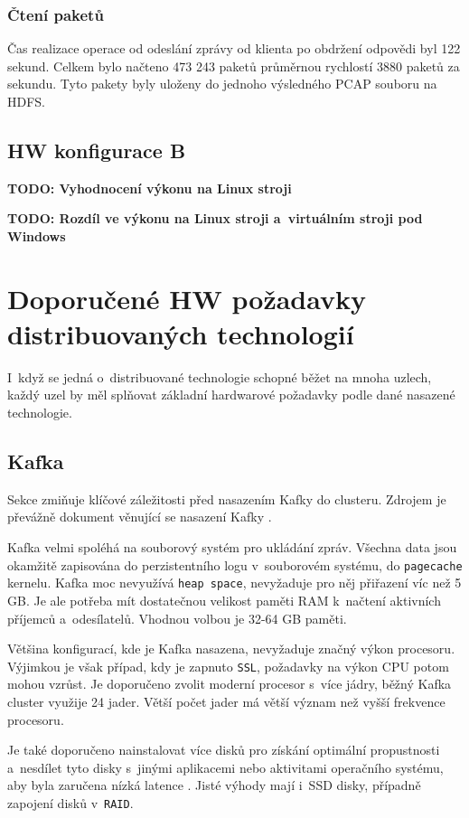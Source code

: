 \subsubsection{Čtení paketů}
Čas realizace operace od odeslání zprávy od klienta po obdržení odpovědi byl 122 sekund. Celkem bylo načteno 473 243 paketů průměrnou rychlostí 3880 paketů za sekundu. Tyto pakety byly uloženy do jednoho výsledného PCAP souboru na HDFS.

\subsection{HW konfigurace B}

\noindent \textbf{TODO: Vyhodnocení výkonu na Linux stroji}

\noindent \textbf{TODO: Rozdíl ve výkonu na Linux stroji a~virtuálním stroji pod Windows}

\section{Doporučené HW požadavky distribuovaných technologií}
I~když se jedná o~distribuované technologie schopné běžet na mnoha uzlech, každý uzel by měl splňovat základní hardwarové požadavky podle dané nasazené technologie.

\subsection{Kafka}
Sekce zmiňuje klíčové záležitosti před nasazením Kafky do clusteru. Zdrojem je převážně dokument věnující se nasazení Kafky \cite{kafkaDeployment}.

Kafka velmi spoléhá na souborový systém pro ukládání zpráv. Všechna data jsou okamžitě zapisována do perzistentního logu v~souborovém systému, do \texttt{pagecache} kernelu. Kafka moc nevyužívá \texttt{heap space}, nevyžaduje pro něj přiřazení víc než 5 GB.
Je ale potřeba mít dostatečnou velikost paměti RAM k~načtení aktivních příjemců a~odesílatelů. Vhodnou volbou je 32-64 GB paměti.

Většina konfigurací, kde je Kafka nasazena, nevyžaduje značný výkon procesoru. Výjimkou je však případ, kdy je zapnuto \texttt{SSL}, požadavky na výkon CPU potom mohou vzrůst. Je doporučeno zvolit moderní procesor s~více jádry, běžný Kafka cluster využije 24 jader. Větší počet jader má větší význam než vyšší frekvence procesoru.

Je také doporučeno nainstalovat více disků pro získání optimální propustnosti a~nesdílet tyto disky s~jinými aplikacemi nebo aktivitami operačního systému, aby byla zaručena nízká latence \cite{kafkaBestPractises}. Jisté výhody mají i~SSD disky, případně zapojení disků v~\texttt{RAID}.

